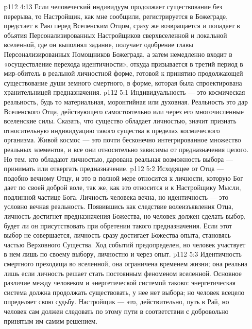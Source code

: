 \vs p112 4:13 Если человеческий индивидуум продолжает существование без перерыва, то Настройщик, как мне сообщили, регистрируется в Божеграде, предстает в Раю перед Вселенским Отцом, сразу же возвращается и попадает в объятия Персонализированных Настройщиков сверхвселенной и локальной вселенной, где он выполнял задание, получает одобрение главы Персонализированных Помощников Божеграда, а затем немедленно входит в «осуществление перехода идентичности», откуда призывается в третий период в мир\hyp{}обитель в реальной личностной форме, готовой к принятию продолжающей существование души земного смертного, в форме, которая была спроектирована хранительницей предназначения.
\vs p112 5:1 Индивидуальность --- это космическая реальность, будь то материальная, моронтийная или духовная. Реальность  это дар Вселенского Отца, действующего самостоятельно или через его многочисленные вселенские силы. Сказать, что существо обладает личностью, значит признать относительную индивидуацию такого существа в пределах космического организма. Живой космос --- это почти бесконечно интегрированное множество реальных элементов, и все они относительно зависимы от предназначения целого. Но тем, кто обладают личностью, дарована реальная возможность выбора --- принимать или отвергать предназначение.
\vs p112 5:2 Исходящее от Отца --- подобно вечному Отцу, и это в полной мере относится к личности, которую Бог дает по своей доброй воле, так же, как это относится и к Настройщику Мысли, подлинной частице Бога. Личность человека вечна, но идентичность --- это условно вечная реальность. Появившись как следствие волеизъявления Отца, личность достигнет предназначения Божества, но человек должен сделать выбор, будет ли он присутствовать при обретении такого предназначения. Если этот выбор не совершается, личность сразу достигает Божества опыта, становясь частью Верховного Существа. Ход событий предопределен, но человек участвует в нем лишь по своему выбору, личностно и через опыт.
\vs p112 5:3 \pc Идентичность смертного преходяща во вселенной, она ограничена временем жизни; она реальна лишь если личность решает стать постоянным феноменом вселенной. Основное различие между человеком и энергетической системой таково: энергетическая система должна продолжать существовать, у нее нет выбора; но человек всецело определяет свою судьбу. Настройщик --- это, действительно, путь в Рай, но человек сам должен следовать по этому пути в соответствии с добровольно принятым им самим решением.

